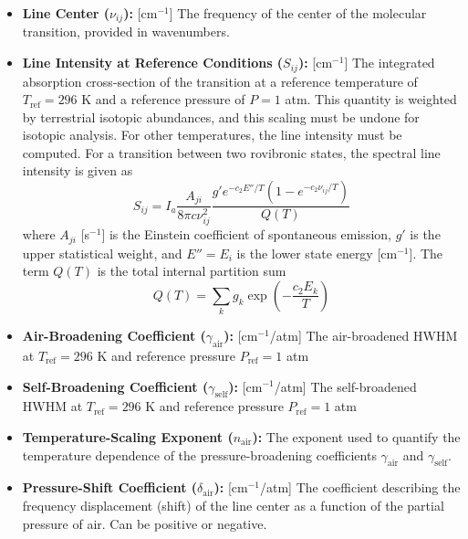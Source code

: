 \documentclass[12pt]{report}
\begin{document}
	\begin{itemize}
		\item \textbf{Line Center ($\nu_{ij}$):} [$\text{cm}^{-1}$] The frequency of the center of the molecular transition, provided in wavenumbers.
		\item \textbf{Line Intensity at Reference Conditions ($S_{ij}$):} [$\text{cm}^{-1}$] The integrated absorption cross-section of the transition at a reference temperature of $T_\mathrm{ref} = 296$ K and a reference pressure of $P=1$ atm. This quantity is weighted by terrestrial isotopic abundances, and this scaling must be undone for isotopic analysis. For other temperatures, the line intensity must be computed. For a transition between two rovibronic states, the spectral line intensity is given as
		\begin{equation}\label{hitran_S}
			S_{ij} = I_a \frac{A_{ji}}{8\pi c \nu_{ij}^2}\frac{g' e^{-c_2E''/T} \left(1-e^{-c_2\nu_{ij} /T}\right)}{Q(T)}
		\end{equation}
		where $A_{ji}$ [s$^{-1}$] is the Einstein coefficient of spontaneous emission, $g'$ is the upper statistical weight, and $E'' = E_i$ is the lower state energy [cm$^{-1}$]. The term $Q(T)$ is the total internal partition sum
		\begin{equation}
			Q(T) = \sum_k g_k \exp\left(-\frac{c_2 E_k}{T}\right)
		\end{equation}
		\item \textbf{Air-Broadening Coefficient ($\gamma_{\mathrm{air}}$):} [cm$^{-1}$/atm] The air-broadened HWHM at $T_\mathrm{ref} = 296$ K and reference pressure $P_\mathrm{ref} = 1$ atm
		\item \textbf{Self-Broadening Coefficient ($\gamma_\mathrm{self}$):} [cm$^{-1}$/atm] The self-broadened HWHM at $T_\mathrm{ref} = 296$ K and reference pressure $P_\mathrm{ref} = 1$ atm
		\item \textbf{Temperature-Scaling Exponent ($n_\mathrm{air}$):} The exponent used to quantify the temperature dependence of the pressure-broadening coefficients $\gamma_\mathrm{air}$ and $\gamma_\mathrm{self}$.
		\item \textbf{Pressure-Shift Coefficient ($\delta_{\text{air}}$):} [cm$^{-1}$/atm] The coefficient describing the frequency displacement (shift) of the line center as a function of the partial pressure of air. Can be positive or negative.

\end{itemize}
\end{document}
